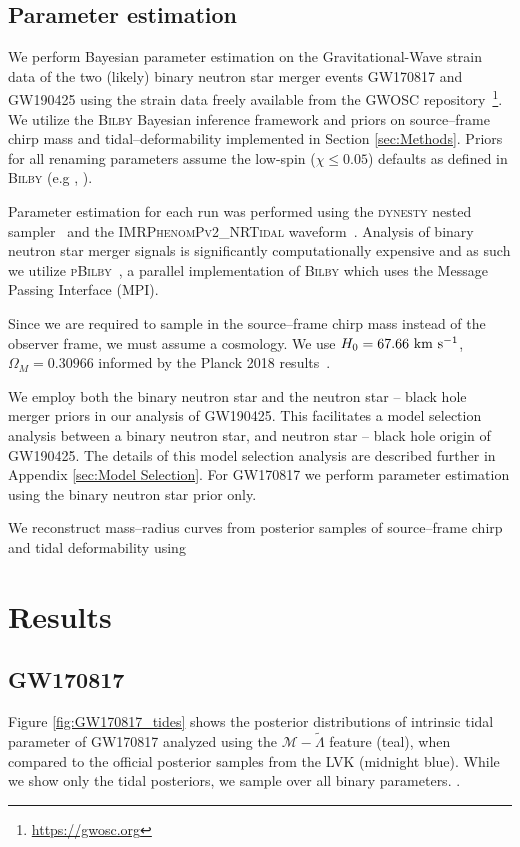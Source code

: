 \documentclass[twocolumn]{aastex631}
\begin{document}
	\subsection{Parameter estimation}
	We perform Bayesian parameter estimation on the Gravitational-Wave strain data of the two (likely) binary neutron star merger events GW170817 and GW190425 using the strain data freely available from the GWOSC repository~\footnote{\url{https://gwosc.org}}. 
	We utilize the \textsc{Bilby} Bayesian inference framework and priors on source--frame chirp mass and tidal--deformability implemented in Section \ref{sec:Methods}. Priors for all renaming parameters assume the low-spin ($\chi \leq 0.05$) defaults as defined in \textsc{Bilby} (e.g \citealt{ashton19}, \citealt{romeroshaw20}).
	
	Parameter estimation for each run was performed using the \textsc{dynesty} nested sampler~\citep{Dynesty} and the \textsc{IMRPhenomPv2\_NRTidal} waveform~\citep{IMRPhenomP_NRtidal}. Analysis of binary neutron star merger signals is significantly computationally expensive and as such we utilize \textsc{pBilby}~\citep{pbilby}, a parallel implementation of \textsc{Bilby} which uses the Message Passing Interface (MPI). 
	
	Since we are required to sample in the source--frame chirp mass instead of the observer frame, we must assume a cosmology. We use $H_0=67.66 \rm  \ km  \ s^{-1}$, $\Omega_M = 0.30966 $ informed by the Planck 2018 results~\citep{Planck}.  
	
	We employ both the binary neutron star and the neutron star -- black hole merger priors in our analysis of GW190425. This facilitates a model selection analysis between a binary neutron star, and neutron star -- black hole origin of GW190425. The details of this model selection analysis are described further in Appendix \ref{sec:Model Selection}. 
	For GW170817 we perform parameter estimation using the binary neutron star prior only. 
	
	We reconstruct mass--radius curves from posterior samples of source--frame chirp and tidal deformability using \red{\ldots}
	
	
	\section{Results} \label{sec:Results}
	
	
	\subsection{GW170817}
	Figure \ref{fig:GW170817_tides} shows the posterior distributions of intrinsic tidal parameter of GW170817 analyzed using the $\mathcal{M}-\tilde{\Lambda}$ feature (teal), when compared to the official posterior samples from the LVK (midnight blue). While we show only the tidal posteriors, we sample over all binary parameters. . 
	
\end{document}
